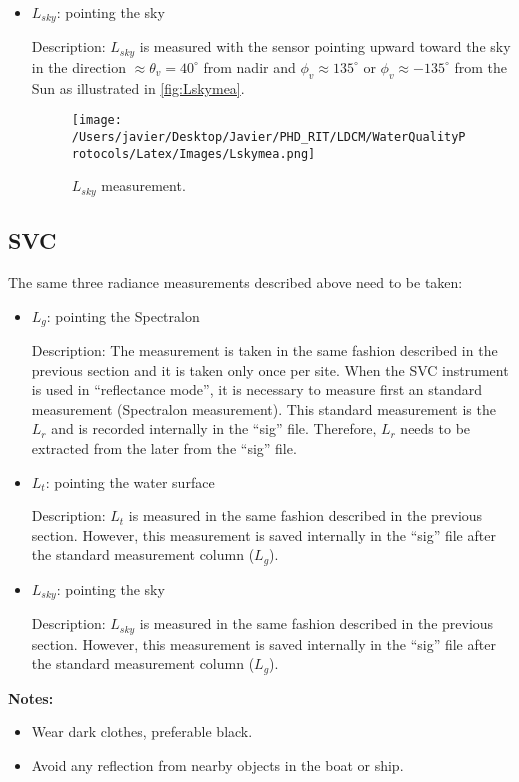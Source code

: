 \begin{appendices}
\begin{itemize}
	\item $L_{sky}$: pointing the sky

Description: $L_{sky}$ is measured with the sensor pointing upward toward the sky in the direction $\approx \theta_v = 40^\circ$ from nadir and $\phi_v \approx 135^\circ$ or $\phi_v \approx -135^\circ$ from the Sun as illustrated in \autoref{fig:Lskymea}.

\begin{figure}[h]
\centering
    \texttt{[image: /Users/javier/Desktop/Javier/PHD\_RIT/LDCM/WaterQualityProtocols/Latex/Images/Lskymea.png]}
    \vspace{0.5cm}
   \caption[]{\label{fig:Lskymea} $L_{sky}$ measurement.}
\end{figure}

\end{itemize}

\subsection{SVC}
The same three radiance measurements described above need to be taken:

\begin{itemize}
	\item $L_g$: pointing the Spectralon

Description: The measurement is taken in the same fashion described in the previous section and it is taken only once per site. When the SVC instrument is used in ``reflectance mode'', it is necessary to measure first an standard measurement (Spectralon measurement). This standard measurement is the $L_r$ and is recorded internally in the ``sig'' file. Therefore, $L_r$ needs to be extracted from the later from the ``sig'' file. 

	\item $L_t$: pointing the water surface

Description: $L_t$ is measured in the same fashion described in the previous section. However, this measurement is saved internally in the ``sig'' file after the standard measurement column ($L_g$).

	\item $L_{sky}$: pointing the sky	

Description: $L_{sky}$ is measured in the same fashion described in the previous section. However, this measurement is saved internally in the ``sig'' file after the standard measurement column ($L_g$).

\end{itemize}
{\bf Notes:}
\begin{itemize}
	\item Wear dark clothes, preferable black.
	\item Avoid any reflection from nearby objects in the boat or ship. 
\end{itemize}

\end{appendices}
